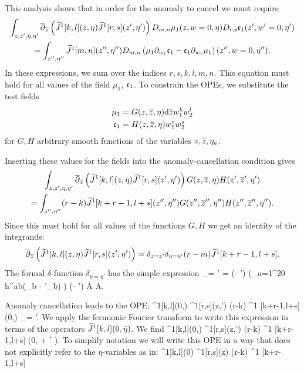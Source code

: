 \documentclass[../main.tex]{subfiles}
\begin{document}
This analysis shows that in order for the anomaly to cancel we must require
\begin{multline} 
	\int_{z,z', \eta,\eta'} \overline{\partial}_{{\overline{z}}} \left( \widetilde{J}^1[k,l] (z,\eta)  \widetilde{J}^1[r,s] (z',\eta') \right)  D_{m,n} \mu_1(z, w = 0, \eta)  D_{r,s}  \mathfrak{c}_1 (z', w' = 0, \eta')  \\
	= \int_{z'',\eta''} \widetilde{J}^1[m,n] (z'',\eta'')  D_{m,n}\left( \mu_1 \partial_{w_1} \mathfrak{c}_1   - \mathfrak{c}_1 \partial_{w_1} \mu_1  \right)(z'',w = 0, \eta'').   
\end{multline}
In these expressions, we sum over the indices $r,s,k,l,m,n$.  This equation must hold for all values of the field $\mu_1$, $\mathfrak{c}_1$. To constrain the OPEs, we substitute the test fields
\begin{align*}
\mu_1 & = G(z,{\overline{z}},\eta) \mathrm{d} {\overline{z}} w_1^k w_2^l \\
\mathfrak{c}_1 & = H(z,{\overline{z}},\eta) w_1^r w_2^s
\end{align*}
for $G,H$ arbitrary smooth functions of the variables $z,{\overline{z}},\eta_a$. 

Inserting these values for the fields into the anomaly-cancellation condition gives
\begin{multline} 
	\int_{z,z', \eta,\eta'} \overline{\partial}_{{\overline{z}}} \left( \widetilde{J}^1[k,l] (z,\eta)  \widetilde{J}^1[r,s] (z',\eta') \right)  G(z,{\overline{z}},\eta) H(z',{\overline{z}}',\eta') \\ 
	= \int_{z'',\eta''} (r-k)  \widetilde{J}^1[k+r-1, l+s] (z'',\eta'')  G(z'',{\overline{z}}'',\eta'') H(z'',{\overline{z}}'', \eta'').
\end{multline}
Since this must hold for all values of the functions $G,H$ we get an identity of the integrands:
\[ 
	\overline{\partial}_{{\overline{z}}} \left( \widetilde{J}^1[k, l] (z,\eta)  \widetilde{J}^1[r,s] (z',\eta') \right)  = \delta_{z = z'} \delta_{\eta = \eta'} (r-m) \widetilde{J}^1[k + r -1, l+s] .  
\]
The formal $\delta$-function $\delta_{\eta = \eta'}$ has the simple expression 
\beqn
\delta_{\eta = \eta'} = (\eta - \eta') \left(\prod_{a=1}^{20} h^{ab}(\eta_b - \eta'_b) \right) (\br \eta - \br \eta') \in A \otimes A.
\eeqn
{}

Anomaly cancellation leads to the OPE:
\beqn
		^1[k,l](0,\eta)  ^1[r,s](z,\eta')  
	\simeq {} (r-k)  ^1 [k+r-1,l+s] (0,\eta) \delta_{\eta = \eta'}. 
\eeqn
We apply the fermionic Fourier transform to write this expression in terms of the operators $\widetilde{J}^1[k,l] (0, \Hat{\eta})$.
We find
\beqn
	^1[k,l](0,\what{\eta})  ^1[r,s](z,\what{\eta}')  
	\simeq {} (r-k)  ^1 [k+r-1,l+s] (0,\what{\eta} + \what{\eta}' ). 
\eeqn
To simplify notation we will write this OPE in a way that does not explicitly refer to the $\eta$-variables as in:
\beqn
		^1[k,l](0) ^1[r,s](z)  
	\simeq {} (r-k)  ^1 [k+r-1,l+s] 
\eeqn
\end{document}
